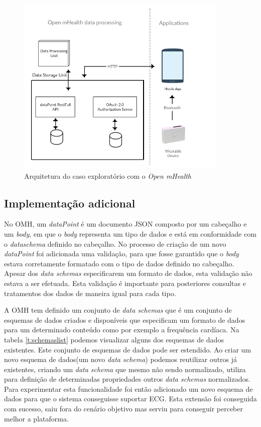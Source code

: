 \begin{figure}[H]
  \centering
  \includegraphics[width=0.9\textwidth]{imgs/omh-arch-exp.png}
  \caption[Arquitetura do caso exploratório com o \textit{Open mHealth}]{Arquitetura do caso exploratório com o \textit{Open mHealth}}
  
  \label{f:exp-omh-arch}
\end{figure}

\subsection{Implementação adicional}
\label{additionalImpl-omh}
No \gls{OMH}, um \textit{dataPoint} é um documento \gls{JSON} composto por um cabeçalho e um \textit{body}, em que o \textit{body} representa um tipo de dados e está em conformidade com o \textit{dataschema} definido no cabeçalho.
No processo de criação de um novo \textit{dataPoint} foi adicionada uma validação, para que fosse garantido que o \textit{body} estava corretamente formatado com o tipo de dados definido no cabeçalho.
Apesar dos \textit{data schemas} especificarem um formato de dados, esta validação não estava a ser efetuada. Esta validação é importante para posteriores consultas e tratamentos dos dados de maneira igual para cada tipo.
\par 


A \gls{OMH} tem definido um conjunto de \textit{data schemas} \cite{omhschemas} que é um conjunto de esquemas de dados criados e disponíveis que especificam um formato de dados para um determinado conteúdo como por exemplo a frequência cardíaca\cite{omhschemas}. Na tabela \ref{t:schemaslist} podemos visualizar alguns dos esquemas de dados existentes. Este conjunto de esquemas de dados pode ser estendido. Ao criar um novo esquema de dados(um novo \textit{data schema}) podemos reutilizar outros já existentes, criando um \textit{data schema} que mesmo não sendo normalizado, utiliza para definição de determinadas propriedades outros \textit{data schemas} normalizados. Para experimentar esta funcionalidade foi então adicionado um novo esquema de dados para que o sistema conseguisse suportar \gls{ECG}. Esta extensão foi conseguida com sucesso, saiu fora do cenário objetivo mas serviu para conseguir perceber melhor a plataforma. \par 
\newpage

